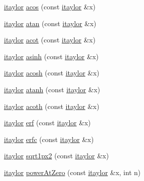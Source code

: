 \begin{DoxyCompactItemize}
\item 
\hyperlink{classtaylor_1_1itaylor}{itaylor} \hyperlink{namespacetaylor_a10ee4a237acfa23e5566bdbc6256c34b}{acos} (const \hyperlink{classtaylor_1_1itaylor}{itaylor} \&x)
\item 
\hyperlink{classtaylor_1_1itaylor}{itaylor} \hyperlink{namespacetaylor_ad4efebf4e010be4ae41fdc661f00417d}{atan} (const \hyperlink{classtaylor_1_1itaylor}{itaylor} \&x)
\item 
\hyperlink{classtaylor_1_1itaylor}{itaylor} \hyperlink{namespacetaylor_af339a9fb39e8c7141cc881baa47c4ea8}{acot} (const \hyperlink{classtaylor_1_1itaylor}{itaylor} \&x)
\item 
\hyperlink{classtaylor_1_1itaylor}{itaylor} \hyperlink{namespacetaylor_aea804ac21a6ac493d1b3b94c320c6d5f}{asinh} (const \hyperlink{classtaylor_1_1itaylor}{itaylor} \&x)
\item 
\hyperlink{classtaylor_1_1itaylor}{itaylor} \hyperlink{namespacetaylor_a9aedcec32b2edf6a4f93169199469bb5}{acosh} (const \hyperlink{classtaylor_1_1itaylor}{itaylor} \&x)
\item 
\hyperlink{classtaylor_1_1itaylor}{itaylor} \hyperlink{namespacetaylor_a3f93cbff36aa827c4da8179674cc1d41}{atanh} (const \hyperlink{classtaylor_1_1itaylor}{itaylor} \&x)
\item 
\hyperlink{classtaylor_1_1itaylor}{itaylor} \hyperlink{namespacetaylor_a425c4a560efdc61060e7c8d368c56a8f}{acoth} (const \hyperlink{classtaylor_1_1itaylor}{itaylor} \&x)
\item 
\hyperlink{classtaylor_1_1itaylor}{itaylor} \hyperlink{namespacetaylor_ae34779c49ee5e1ce798eafb83de238d0}{erf} (const \hyperlink{classtaylor_1_1itaylor}{itaylor} \&x)
\item 
\hyperlink{classtaylor_1_1itaylor}{itaylor} \hyperlink{namespacetaylor_a33b5e2b4ab7dcafac6e1d96991c94e8d}{erfc} (const \hyperlink{classtaylor_1_1itaylor}{itaylor} \&x)
\item 
\hyperlink{classtaylor_1_1itaylor}{itaylor} \hyperlink{namespacetaylor_a319f85acd3f83eb66fba6be32346573e}{sqrt1px2} (const \hyperlink{classtaylor_1_1itaylor}{itaylor} \&x)
\item 
\hyperlink{classtaylor_1_1itaylor}{itaylor} \hyperlink{namespacetaylor_a51730e93b533e086e3d94d2aaeba4e24}{power\-At\-Zero} (const \hyperlink{classtaylor_1_1itaylor}{itaylor} \&x, int n)
\end{DoxyCompactItemize}



